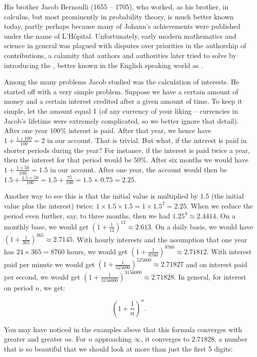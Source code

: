 \documentclass[tikz]{scrreprt}
\begin{document}
His brother Jacob Bernoulli (1655 -- 1705),
who worked, as his brother, in calculus, but
most prominently in probability theory, 
is much better known today, partly perhaps
because many of Johann's achievements 
were published under the name of L'Hôpital.
Unfortunately, early modern mathematics 
and science in general was
plagued with disputes over priorities in the
authorship of contributions, a calamity
that authors and authorities later tried to
solve by introducing the ,
better known in the English speaking world as
.

Among the many problems Jacob studied was
the calculation of interests. He started off
with a very simple problem. Suppose we have
a certain amount of money and a certain interest
credited after a given amount of time. To keep it
simple, let the amount equal 1 (of any currency
of your liking -- currencies in Jacob's lifetime
were extremely complicated, so we better ignore
that detail). After one year $100\%$ interest is paid.
After that year, we hence have $1+\frac{1\times 100}{100} = 2$ 
in our account. That is trivial.
But what, if the interest is paid in shorter periods
during the year?
For instance, if the interest is paid twice a year,
then the interest for that period would be $50\%$.
After six months we would have $1+\frac{1\times 50}{100} = 1.5$
in our account. After one year, the account would then be
$1.5 + \frac{1.5\times 50}{100} = 1.5 + \frac{75}{100} = 1.5 + 0.75 = 2.25$.

Another way to see this is that the initial value 
is multiplied by 1.5 (the initial value plus the interest) twice:
$1 \times 1.5 \times 1.5 = 1 \times 1.5^2 = 2.25$.
When we reduce the period even further, say, to three months,
then we had $1.25^4 \approx 2.4414$. On a monthly base,
we would get $\left(1+\frac{1}{12}\right)^{12} \approx 2.613$.
On a daily basis, we would have 
$\left(1+\frac{1}{365}\right)^{365} \approx 2.7145$.
With hourly interests and the assumption
that one year has $24 \times 365 = 8760$ hours, 
we would get $\left(1+\frac{1}{8760}\right)^{8760} \approx 2.71812$.
With interest paid per minute we would get
$\left(1+\frac{1}{525600}\right)^{525600} \approx 2.71827$ and
on interest paid per second, we would get
$\left(1+\frac{1}{3156000}\right)^{3156000} \approx 2.71828$.
In general, for interest on period $n$, we get:

\[
\left(1+\frac{1}{n}\right)^n.
\] 

You may have noticed in the examples above
that this formula converges with greater and greater $n$s.
For $n$ approaching $\infty$, it converges
to $2.71828$, a number that is so beautiful that we should
look at more than just the first 5 digits:
\end{document}
